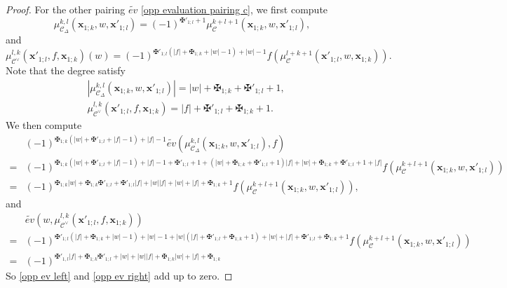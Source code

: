 \documentclass[11pt]{amsproc}
\def\cc{\mathcal{C}}
\def\D{\Delta}
\theoremstyle{remark}
\numberwithin{equation}{section}
\begin{document}
\begin{proof}
For the other pairing $\tilde{ev}$ \eqref{opp evaluation pairing c}, we first compute
\begin{equation}
\mu_{\cc_{\D}}^{k, l}(\mathbf{x}_{1;k}, w, \mathbf{x}'_{1;l}) = (-1)^{\maltese'_{1;l} + 1} \mu_{\cc}^{k+l+1}(\mathbf{x}_{1;k}, w, \mathbf{x}'_{1;l}),
\end{equation}
and
\begin{equation}
\mu_{\cc^{\vee}}^{l, k}(\mathbf{x}'_{1;l}, f, \mathbf{x}_{1;k})(w)  = (-1)^{\maltese'_{1;l}(|f| + \maltese_{1;k} + |w| - 1) + |w| - 1} f(\mu_{\cc}^{l+k+1}(\mathbf{x}'_{1;l}, w, \mathbf{x}_{1;k})).
\end{equation}
Note that the degree satisfy
\begin{align}
& |\mu_{\cc_{\D}}^{k, l}(\mathbf{x}_{1;k}, w, \mathbf{x}'_{1;l})| = |w| + \maltese_{1;k} + \maltese'_{1;l} + 1, \\
& \mu_{\cc^{\vee}}^{l, k}(\mathbf{x}'_{1;l}, f, \mathbf{x}_{1;k}) = |f| + \maltese'_{1;l} + \maltese_{1;k} + 1.
\end{align}
We then compute
\begin{equation}\label{opp ev left}
\begin{split}
& (-1)^{\maltese_{1;k}(|w| + \maltese'_{1;l} + |f| - 1) + |f| -  1} \tilde{ev}(\mu_{\cc_{\D}}^{k, l}(\mathbf{x}_{1;k}, w, \mathbf{x}'_{1;l}), f) \\
= & (-1)^{\maltese_{1;k}(|w| + \maltese'_{1;l} + |f| - 1) + |f| - 1 + \maltese'_{1;l} + 1 + (|w| + \maltese_{1;k} + \maltese'_{1;l} + 1)|f| + |w| + \maltese_{1;k} + \maltese'_{1;l} + 1 + |f|} f(\mu_{\cc}^{k+l+1}(\mathbf{x}_{1;k}, w, \mathbf{x}'_{1;l})) \\
= & (-1)^{\maltese_{1;k}|w| + \maltese_{1;k} \maltese'_{1;l} + \maltese'_{1;l}|f| + |w||f| + |w| + |f| + \maltese_{1;k} + 1} f(\mu_{\cc}^{k+l+1}(\mathbf{x}_{1;k}, w, \mathbf{x}'_{1;l})),
\end{split}
\end{equation}
and
\begin{equation}\label{opp ev right}
\begin{split}
& \tilde{ev}(w, \mu_{\cc^{\vee}}^{l, k}(\mathbf{x}'_{1;l}, f, \mathbf{x}_{1;k})) \\
= & (-1)^{\maltese'_{1;l}(|f| + \maltese_{1;k} + |w| - 1) + |w| - 1 + |w|(|f| + \maltese'_{1;l} + \maltese_{1;k} + 1) + |w| +  |f| + \maltese'_{1;l} + \maltese_{1;k} + 1} f(\mu_{\cc}^{k + l + 1}(\mathbf{x}_{1;k}, w, \mathbf{x}'_{1;l}))\\
= & (-1)^{\maltese'_{1,l}|f| + \maltese_{1;k} \maltese'_{1;l} + |w| + |w||f|  + \maltese_{1;k}|w| + |f| + \maltese_{1;k}}
\end{split}
\end{equation}
So \eqref{opp ev left} and \eqref{opp ev right} add up to zero.
\end{proof}
\end{document}
